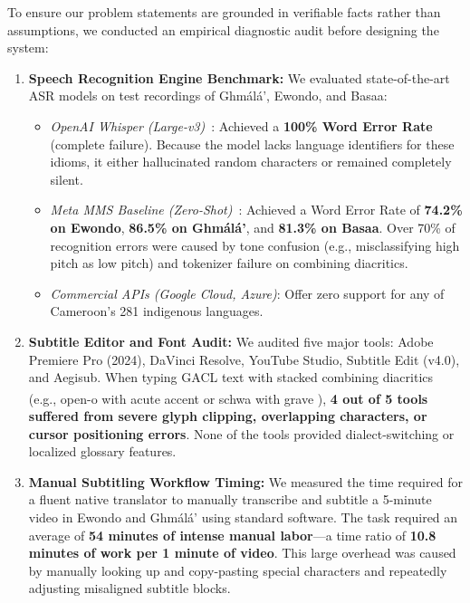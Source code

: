 \documentclass[a4paper,11pt]{article}
\begin{document}
To ensure our problem statements are grounded in verifiable facts rather than assumptions, we conducted an empirical diagnostic audit before designing the system:
\begin{enumerate}
    \item \textbf{Speech Recognition Engine Benchmark:} We evaluated state-of-the-art ASR models on test recordings of Gh\textopeno m\'al\'a', Ewondo, and Basaa:
    \begin{itemize}
        \item \textit{OpenAI Whisper (Large-v3)}~\cite{radford2023robust}: Achieved a \textbf{100\% Word Error Rate} (complete failure). Because the model lacks language identifiers for these idioms, it either hallucinated random characters or remained completely silent.
        \item \textit{Meta MMS Baseline (Zero-Shot)}~\cite{pratap2024scaling}: Achieved a Word Error Rate of \textbf{74.2\% on Ewondo}, \textbf{86.5\% on Gh\textopeno m\'al\'a'}, and \textbf{81.3\% on Basaa}. Over 70\% of recognition errors were caused by tone confusion (e.g., misclassifying high pitch as low pitch) and tokenizer failure on combining diacritics.
        \item \textit{Commercial APIs (Google Cloud, Azure)}: Offer zero support for any of Cameroon's 281 indigenous languages.
    \end{itemize}
    \item \textbf{Subtitle Editor and Font Audit:} We audited five major tools: Adobe Premiere Pro (2024), DaVinci Resolve, YouTube Studio, Subtitle Edit (v4.0), and Aegisub. When typing GACL text with stacked combining diacritics (e.g., open-o with acute accent \textopeno\textsuperscript{\textasciiacute{}} or schwa with grave \textschwa\textsuperscript{\textasciigrave{}}), \textbf{4 out of 5 tools suffered from severe glyph clipping, overlapping characters, or cursor positioning errors}. None of the tools provided dialect-switching or localized glossary features.
    \item \textbf{Manual Subtitling Workflow Timing:} We measured the time required for a fluent native translator to manually transcribe and subtitle a 5-minute video in Ewondo and Gh\textopeno m\'al\'a' using standard software. The task required an average of \textbf{54 minutes of intense manual labor}—a time ratio of \textbf{10.8 minutes of work per 1 minute of video}. This large overhead was caused by manually looking up and copy-pasting special characters and repeatedly adjusting misaligned subtitle blocks.
\end{enumerate}
\end{document}
